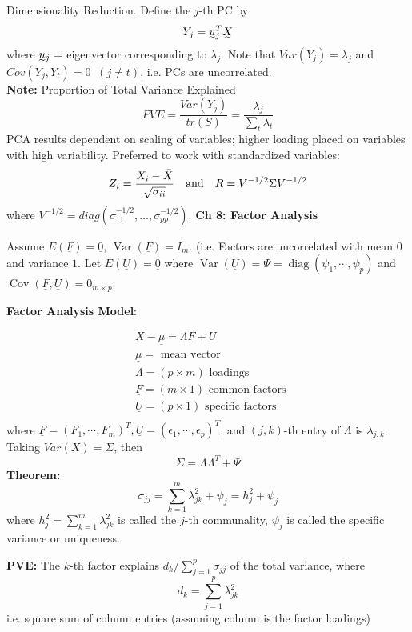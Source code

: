 \documentclass[a4paper]{article}
\newcommand{\subheading}[1]{{\scriptsize\textbf{#1}}}
\begin{document}
\begin{multicols*}{4}
Dimensionality Reduction. Define the $j$-th PC by
$$
Y_j = \undertilde{u}_j^T\undertilde{X} 
$$
where $\undertilde{u}_j =$ eigenvector corresponding to $\lambda_j$. Note that $Var(Y_j) = \lambda_j$ and $Cov(Y_j,Y_t)=0 \;\; (j \neq t)$, i.e. PCs are uncorrelated. \\
\smallskip 
\textbf{Note:} Proportion of Total Variance Explained $$PVE=\frac{Var(Y_j)}{tr(S)}=\frac{\lambda_j}{\sum_t \lambda_t}$$
PCA results dependent on scaling of variables; higher loading placed on variables with high variability. Preferred to work with standardized variables:
$$
Z_i = \frac{X_i - \Bar{X}}{\sqrt{\sigma_{ii}}} \quad \text{and} \quad R = V^{-1/2}\Sigma V^{-1/2} 
$$
where $V^{-1/2} = diag(\sigma_{11}^{-1/2},\dots,\sigma_{pp}^{-1/2})$.
\smallskip
\hline
\smallskip
\subheading{Ch 8: Factor Analysis}

Assume $E(\underline{F})=\underline{0}$, $\operatorname{Var}(\underline{F})=I_m$. (i.e. Factors are uncorrelated with mean $0$ and variance $1$. Let $E(\underline{U})=\underline{0}$ where
$\operatorname{Var}(\underline{U})=\Psi=\operatorname{diag}\left(\psi_1, \cdots, \psi_p\right)$ and 
$\operatorname{Cov}(\underline{F}, \underline{U})=0_{m \times p}$.

\textbf{Factor Analysis Model}:

$$
\begin{aligned}
&\underline{X}-\underline{\mu}=\Lambda \underline{F}+\underline{U} \\
&\underline{\mu}=\text { mean vector } \\
&\Lambda=(p \times m) \text { loadings } \\
&\underline{F}=(m \times 1) \text { common factors } \\
&\underline{U}=(p \times 1) \text { specific factors } \\
\end{aligned}
$$
where $\underline{F}=\left(F_1, \cdots, F_m\right)^T, \underline{U}=\left(\epsilon_1, \cdots, \epsilon_p\right)^T$, and $(j, k)$-th entry of $\Lambda$ is $\lambda_{j, k}$. \\ Taking $Var(X)=\Sigma$, then
$$
\Sigma = \Lambda \Lambda^T + \Psi
$$
\textbf{Theorem:}
$$
\sigma_{j j}=\sum_{k=1}^m \lambda_{j k}^2+\psi_j=h_j^2+\psi_j
$$
where $h_j^2=\sum_{k=1}^m \lambda_{j k}^2$ is called the $j$-th communality,
$\psi_j$ is called the specific variance or uniqueness.
\smallskip

\textbf{PVE:}  The $k$-th factor explains $d_k / \sum_{j=1}^p \sigma_{j j}$ of the total variance, where
$$
d_k=\sum_{j=1}^p \lambda_{j k}^2
$$
i.e. square sum of column entries (assuming column is the factor loadings)
\smallskip


\end{multicols*}
\end{document}
